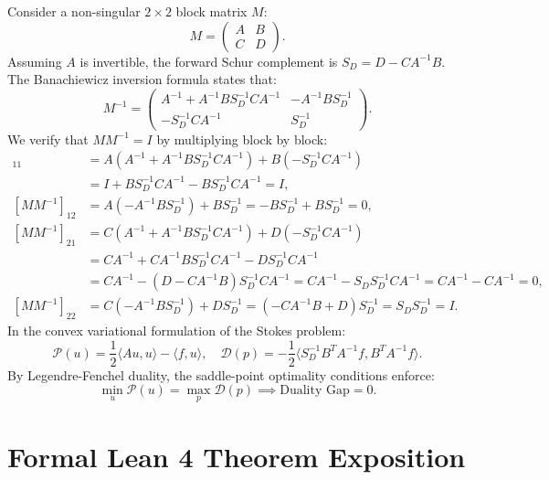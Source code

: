 \documentclass[11pt,a4paper]{article}
\theoremstyle{definition}
\begin{document}
Consider a non-singular $2 \times 2$ block matrix $M$:
\begin{equation}
M = \begin{pmatrix} A & B \\ C & D \end{pmatrix}.
\end{equation}
Assuming $A$ is invertible, the forward Schur complement is $S_D = D - C A^{-1} B$. The Banachiewicz inversion formula states that:
\begin{equation}
M^{-1} = \begin{pmatrix} A^{-1} + A^{-1} B S_D^{-1} C A^{-1} & - A^{-1} B S_D^{-1} \\ - S_D^{-1} C A^{-1} & S_D^{-1} \end{pmatrix}.
\end{equation}
We verify that $M M^{-1} = I$ by multiplying block by block:
\begin{align}
[M M^{-1}]_{11} &= A(A^{-1} + A^{-1} B S_D^{-1} C A^{-1}) + B(- S_D^{-1} C A^{-1}) \\
&= I + B S_D^{-1} C A^{-1} - B S_D^{-1} C A^{-1} = I, \\
[M M^{-1}]_{12} &= A(- A^{-1} B S_D^{-1}) + B S_D^{-1} = - B S_D^{-1} + B S_D^{-1} = 0, \\
[M M^{-1}]_{21} &= C(A^{-1} + A^{-1} B S_D^{-1} C A^{-1}) + D(- S_D^{-1} C A^{-1}) \\
&= C A^{-1} + C A^{-1} B S_D^{-1} C A^{-1} - D S_D^{-1} C A^{-1} \\
&= C A^{-1} - (D - C A^{-1} B) S_D^{-1} C A^{-1} = C A^{-1} - S_D S_D^{-1} C A^{-1} = C A^{-1} - C A^{-1} = 0, \\
[M M^{-1}]_{22} &= C(- A^{-1} B S_D^{-1}) + D S_D^{-1} = (- C A^{-1} B + D) S_D^{-1} = S_D S_D^{-1} = I.
\end{align}
In the convex variational formulation of the Stokes problem:
\begin{equation}
\mathcal{P}(u) = \frac{1}{2} \langle A u, u \rangle - \langle f, u \rangle, \quad \mathcal{D}(p) = - \frac{1}{2} \langle S_D^{-1} B^T A^{-1} f, B^T A^{-1} f \rangle.
\end{equation}
By Legendre-Fenchel duality, the saddle-point optimality conditions enforce:
\begin{equation}
\min_{u} \mathcal{P}(u) = \max_{p} \mathcal{D}(p) \implies \text{Duality Gap} = 0.
\end{equation}


\section{Formal Lean 4 Theorem Exposition}
\end{document}
